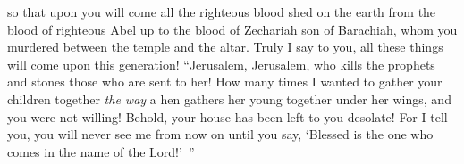 \begin{biblechapter}
\verse so that upon you will come all the righteous blood shed on the earth from the blood of righteous Abel up to the blood of Zechariah son of Barachiah, whom you murdered between the temple and the altar.
\verse Truly I say to you, all these things will come upon this generation!
 “Jerusalem, Jerusalem, who kills the prophets and stones those who are sent to her! How many times I wanted to gather your children together \textit{the way} a hen gathers her young together under her wings, and you were not willing!
\verse Behold, your house has been left to you desolate!
\verse For I tell you, you will never see me from now on until you say, ‘Blessed is the one who comes in the name of the Lord!’ ”
\end{biblechapter}

